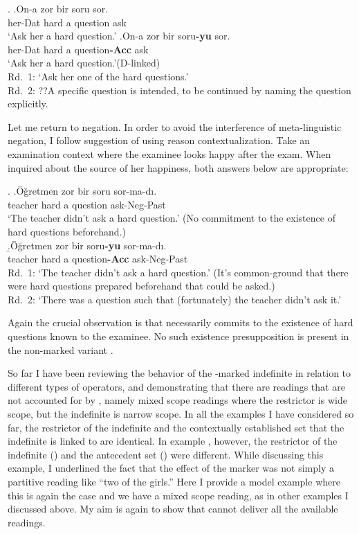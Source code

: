 \documentclass[11pt,a4paper]{article}
\begin{document}
\ex.
\ag.\label{impz}{On-a} {zor} {bir} {soru} {sor}.\\
{her-Dat} {hard} {a} {question} {ask}\\
`Ask her a hard question.'
\bg.\label{impa}{On-a} {zor} {bir} {soru\bf{-yu}} {sor}.\\
{her-Dat} {hard} {a} {question\bf{-Acc}} {ask}\\
`Ask her a hard question.'\hfill (D-linked)\\
Rd.\ 1: `Ask her one of the hard questions.'\\
Rd.\ 2: ??A specific question is intended, to be continued by naming the question
explicitly.


Let me return to negation. In order to avoid the interference of
meta-linguistic negation, I follow  suggestion of using
reason contextualization. Take an examination context where the examinee looks
happy after the exam. When inquired about the source of her happiness, both
answers below are appropriate:  

\ex.
\a.\label{sorunegz}Öğretmen zor bir soru sor-ma-dı.\\
teacher hard a question ask-Neg-Past\\
`The teacher didn't ask a hard question.' (No commitment to the
existence of hard questions beforehand.)\\
\b.\label{sorunega}Öğretmen zor bir soru{\bf-yu} sor-ma-dı.\\
teacher hard a question{\bf-Acc} ask-Neg-Past\\
Rd.\ 1: `The teacher didn't ask a hard question.' (It's
common-ground that there were hard questions prepared beforehand that could be asked.)\\
Rd.\ 2: `There was a question such that (fortunately) the teacher didn't ask
it.'

Again the crucial observation is that  necessarily commits to
the existence of hard questions known to the examinee. No such existence
presupposition is present in the non-marked variant .

So far I have been reviewing the behavior of the \acc-marked indefinite in
relation to different types of operators, and demonstrating that there are
readings that are not accounted for by , namely mixed scope
readings where the restrictor is wide scope, but the indefinite is narrow
scope. In all the examples I have considered so far, the restrictor of the
indefinite and the contextually established set that the indefinite is linked
to are identical. In  example , however, the restrictor
of the indefinite () and the antecedent set () were
different. While discussing this example, I underlined the fact that the effect
of the marker was not simply a partitive reading like ``two of the girls.''
Here I provide a model example where this is again the case and we have a mixed
scope reading, as in other examples I discussed above. My aim is again to show
that  cannot deliver all the available readings. 
 
\end{document}
